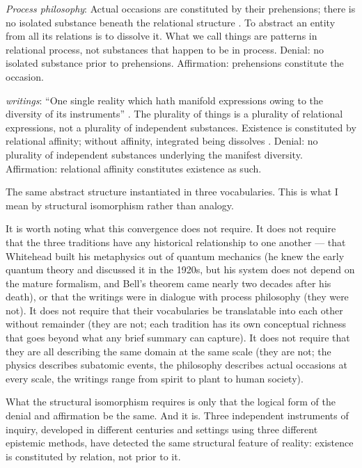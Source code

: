 \emph{Process philosophy}: Actual occasions are constituted by their prehensions; there is no isolated substance beneath the relational structure \citep{Whitehead1929}. To abstract an entity from all its relations is to dissolve it. What we call things are patterns in relational process, not substances that happen to be in process. Denial: no isolated substance prior to prehensions. Affirmation: prehensions constitute the occasion.

\emph{\bahai writings}: ``One single reality which hath manifold expressions owing to the diversity of its instruments'' \citep[para.~35]{SummonsLordHosts}. The plurality of things is a plurality of relational expressions, not a plurality of independent substances. Existence is constituted by relational affinity; without affinity, integrated being dissolves \citep[Talk 41, Talk 48]{PUP}. Denial: no plurality of independent substances underlying the manifest diversity. Affirmation: relational affinity constitutes existence as such.

The same abstract structure instantiated in three vocabularies. This is what I mean by structural isomorphism rather than analogy.

It is worth noting what this convergence does not require. It does not require that the three traditions have any historical relationship to one another --- that Whitehead built his metaphysics out of quantum mechanics (he knew the early quantum theory and discussed it in the 1920s, but his system does not depend on the mature formalism, and Bell's theorem came nearly two decades after his death), or that the \bahai writings were in dialogue with process philosophy (they were not). It does not require that their vocabularies be translatable into each other without remainder (they are not; each tradition has its own conceptual richness that goes beyond what any brief summary can capture). It does not require that they are all describing the same domain at the same scale (they are not; the physics describes subatomic events, the philosophy describes actual occasions at every scale, the writings range from spirit to plant to human society).

What the structural isomorphism requires is only that the logical form of the denial and affirmation be the same. And it is. Three independent instruments of inquiry, developed in different centuries and settings using three different epistemic methods, have detected the same structural feature of reality: existence is constituted by relation, not prior to it.


